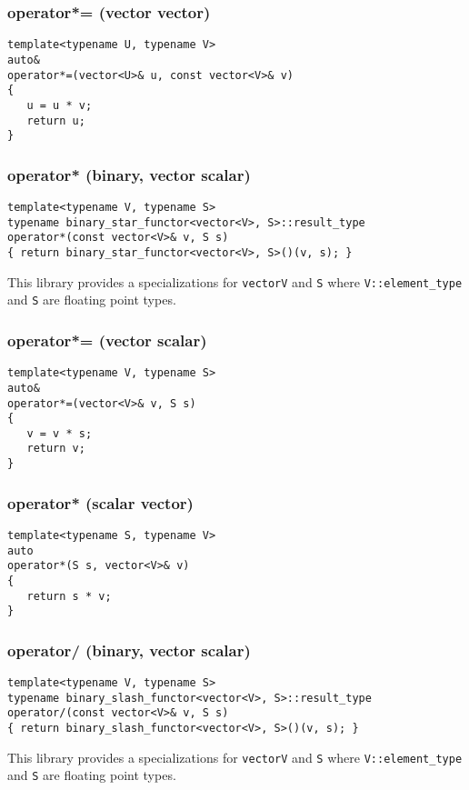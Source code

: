 \documentclass[oneside]{book}
\begin{document}
\subsubsection{operator*= (vector vector)}
\begin{verbatim}
template<typename U, typename V>
auto&
operator*=(vector<U>& u, const vector<V>& v)
{
   u = u * v;
   return u;
}
\end{verbatim}

\subsubsection{operator* (binary, vector scalar)}
\begin{verbatim}
template<typename V, typename S>
typename binary_star_functor<vector<V>, S>::result_type
operator*(const vector<V>& v, S s)
{ return binary_star_functor<vector<V>, S>()(v, s); }
\end{verbatim}
This library provides a specializations for \texttt{vector\textlangle V\textrangle}
and \texttt{S} where    \texttt{V::element\_type} and \texttt{S} are floating point
types.

\subsubsection{operator*= (vector scalar)}
\begin{verbatim}
template<typename V, typename S>
auto&
operator*=(vector<V>& v, S s)
{
   v = v * s;
   return v;
}
\end{verbatim}

\subsubsection{operator* (scalar vector)}
\begin{verbatim}
template<typename S, typename V>
auto
operator*(S s, vector<V>& v)
{
   return s * v;
}
\end{verbatim}

\subsubsection{operator/ (binary, vector scalar)}
\begin{verbatim}
template<typename V, typename S>
typename binary_slash_functor<vector<V>, S>::result_type
operator/(const vector<V>& v, S s)
{ return binary_slash_functor<vector<V>, S>()(v, s); }
\end{verbatim}
This library provides a specializations for \texttt{vector\textlangle V\textrangle}
and \texttt{S} where    \texttt{V::element\_type} and \texttt{S} are floating point
types.
\end{document}
